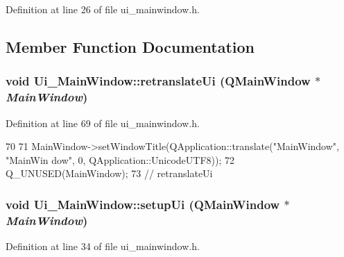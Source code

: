 Definition at line 26 of file ui\_\-mainwindow.h.

\subsection{Member Function Documentation}
\hypertarget{class_ui___main_window_a097dd160c3534a204904cb374412c618}{
\subsubsection[{retranslateUi}]{\setlength{\rightskip}{0pt plus 5cm}void Ui\_\-MainWindow::retranslateUi (QMainWindow $\ast$ {\em MainWindow})}}
\label{class_ui___main_window_a097dd160c3534a204904cb374412c618}


Definition at line 69 of file ui\_\-mainwindow.h.


\begin{DoxyCode}
70     {
71         MainWindow->setWindowTitle(QApplication::translate("MainWindow", "MainWin
      dow", 0, QApplication::UnicodeUTF8));
72         Q_UNUSED(MainWindow);
73     } // retranslateUi
\end{DoxyCode}
\hypertarget{class_ui___main_window_acf4a0872c4c77d8f43a2ec66ed849b58}{
\subsubsection[{setupUi}]{\setlength{\rightskip}{0pt plus 5cm}void Ui\_\-MainWindow::setupUi (QMainWindow $\ast$ {\em MainWindow})}}
\label{class_ui___main_window_acf4a0872c4c77d8f43a2ec66ed849b58}


Definition at line 34 of file ui\_\-mainwindow.h.


